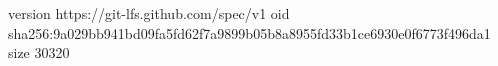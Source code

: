 version https://git-lfs.github.com/spec/v1
oid sha256:9a029bb941bd09fa5fd62f7a9899b05b8a8955fd33b1ce6930e0f6773f496da1
size 30320
